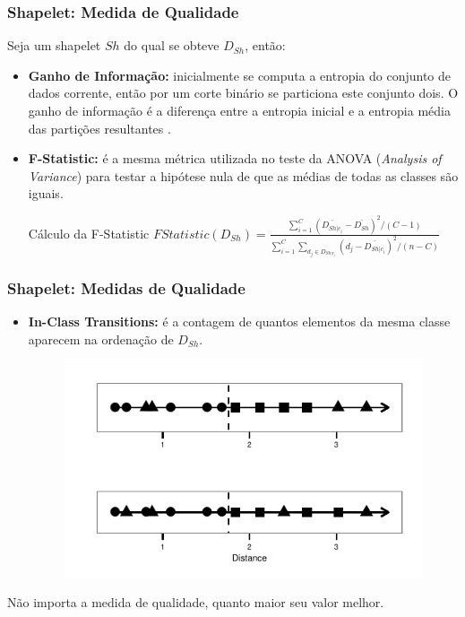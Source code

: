 \documentclass{beamer}
\begin{document}

\begin{frame}
\frametitle{Shapelet: Medida de Qualidade}

Seja um shapelet $Sh$ do qual se obteve $D_{Sh}$, ent{\~a}o:

\begin{itemize}
\item \textbf{Ganho de Informa{\c c}{\~a}o:} inicialmente se computa a entropia do conjunto de dados corrente, ent{\~a}o por um corte bin{\'a}rio se particiona este conjunto dois. O ganho de informa{\c c}{\~a}o {\'e} a diferen{\c c}a entre a entropia inicial e a entropia m{\'e}dia das parti{\c c}{\~o}es resultantes \cite{quinlan1992c4}.
\item \textbf{F-Statistic:} {\'e} a mesma m{\'e}trica utilizada no teste da ANOVA (\textit{Analysis of Variance}) para testar a hip{\'o}tese nula de que as m{\'e}dias de todas as classes s{\~a}o iguais.
\begin{block}{C{\'a}lculo da F-Statistic}
$FStatistic(D_{Sh}) = \frac{\sum_{i = 1}^{C}(\bar{D_{Sh | c_{i}}} - \bar{D_{Sh}})^{2} / (C - 1)}{\sum_{i = 1}^{C} \sum_{d_{j} \in D_{Sh | c_{i}}} (d_{j} - \bar{D_{Sh | c_{i}}})^{2} / (n - C)}$
\end{block}
\end{itemize}
\end{frame}


\begin{frame}
\frametitle{Shapelet: Medidas de Qualidade}

\begin{itemize}
\item \textbf{In-Class Transitions:} {\'e} a contagem de quantos elementos da mesma classe aparecem na ordena{\c c}{\~a}o de $D_{Sh}$.

\begin{figure}
\includegraphics[width=0.7\linewidth]{images/in-class-transitions.pdf}
\end{figure}
\end{itemize}

N{\~a}o importa a medida de qualidade, quanto maior seu valor melhor.
\end{frame}
\end{document}

